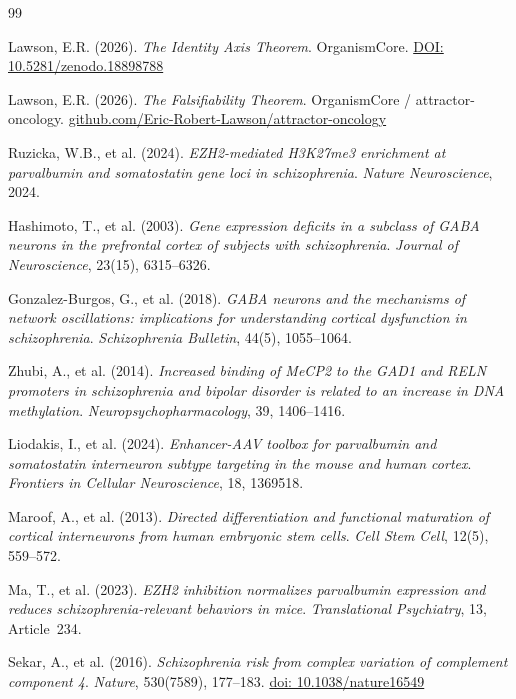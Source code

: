 \documentclass[12pt,a4paper]{article}
\begin{document}
\newpage
\begin{thebibliography}{99}

Lawson, E.R. (2026). \textit{The Identity Axis Theorem}.
OrganismCore.
\href{https://doi.org/10.5281/zenodo.18898788}
{DOI: 10.5281/zenodo.18898788}

Lawson, E.R. (2026). \textit{The Falsifiability Theorem}.
OrganismCore / attractor-oncology.
\href{https://github.com/Eric-Robert-Lawson/attractor-oncology}
{github.com/Eric-Robert-Lawson/attractor-oncology}

Ruzicka, W.B., et al. (2024).
\textit{EZH2-mediated H3K27me3 enrichment at
parvalbumin and somatostatin gene loci in
schizophrenia}.
\textit{Nature Neuroscience}, 2024.

Hashimoto, T., et al. (2003).
\textit{Gene expression deficits in a subclass of GABA
neurons in the prefrontal cortex of subjects with
schizophrenia}.
\textit{Journal of Neuroscience}, 23(15), 6315--6326.

Gonzalez-Burgos, G., et al. (2018).
\textit{GABA neurons and the mechanisms of network
oscillations: implications for understanding cortical
dysfunction in schizophrenia}.
\textit{Schizophrenia Bulletin}, 44(5), 1055--1064.

Zhubi, A., et al. (2014).
\textit{Increased binding of MeCP2 to the GAD1 and RELN
promoters in schizophrenia and bipolar disorder is related
to an increase in DNA methylation}.
\textit{Neuropsychopharmacology}, 39, 1406--1416.

Liodakis, I., et al. (2024).
\textit{Enhancer-AAV toolbox for parvalbumin and
somatostatin interneuron subtype targeting in the mouse
and human cortex}.
\textit{Frontiers in Cellular Neuroscience}, 18, 1369518.

Maroof, A., et al. (2013).
\textit{Directed differentiation and functional maturation
of cortical interneurons from human embryonic stem cells}.
\textit{Cell Stem Cell}, 12(5), 559--572.

Ma, T., et al. (2023).
\textit{EZH2 inhibition normalizes parvalbumin expression
and reduces schizophrenia-relevant behaviors in mice}.
\textit{Translational Psychiatry}, 13, Article~234.

Sekar, A., et al. (2016).
\textit{Schizophrenia risk from complex variation of
complement component 4}.
\textit{Nature}, 530(7589), 177--183.
\href{https://doi.org/10.1038/nature16549}
{doi: 10.1038/nature16549}


\end{thebibliography}
\end{document}

